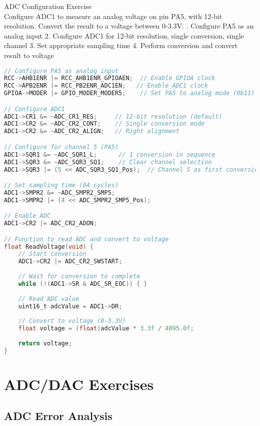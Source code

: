 \begin{example2}{ADC Configuration Exercise}\\
Configure ADC1 to measure an analog voltage on pin PA5, with 12-bit resolution. Convert the result to a voltage between 0-3.3V.
. Configure PA5 as an analog input
2. Configure ADC1 for 12-bit resolution, single conversion, single channel
3. Set appropriate sampling time
4. Perform conversion and convert result to voltage

\begin{lstlisting}[language=C, style=basesmol]
// Configure PA5 as analog input
RCC->AHB1ENR |= RCC_AHB1ENR_GPIOAEN;  // Enable GPIOA clock
RCC->APB2ENR |= RCC_PB2ENR_ADC1EN;   // Enable ADC1 clock
GPIOA->MODER |= GPIO_MODER_MODER5;    // Set PA5 to analog mode (0b11)

// Configure ADC1
ADC1->CR1 &= ~ADC_CR1_RES;     // 12-bit resolution (default)
ADC1->CR2 &= ~ADC_CR2_CONT;    // Single conversion mode
ADC1->CR2 &= ~ADC_CR2_ALIGN;   // Right alignment

// Configure for channel 5 (PA5)
ADC1->SQR1 &= ~ADC_SQR1_L;      // 1 conversion in sequence
ADC1->SQR3 &= ~ADC_SQR3_SQ1;    // Clear channel selection
ADC1->SQR3 |= (5 << ADC_SQR3_SQ1_Pos);  // Channel 5 as first conversion

// Set sampling time (84 cycles)
ADC1->SMPR2 &= ~ADC_SMPR2_SMP5;
ADC1->SMPR2 |= (4 << ADC_SMPR2_SMP5_Pos);

// Enable ADC
ADC1->CR2 |= ADC_CR2_ADON;

// Function to read ADC and convert to voltage
float ReadVoltage(void) {
    // Start conversion
    ADC1->CR2 |= ADC_CR2_SWSTART;
    
    // Wait for conversion to complete
    while (!(ADC1->SR & ADC_SR_EOC)) { }
    
    // Read ADC value
    uint16_t adcValue = ADC1->DR;
    
    // Convert to voltage (0-3.3V)
    float voltage = (float)adcValue * 3.3f / 4095.0f;
    
    return voltage;
}
\end{lstlisting}
\end{example2}

\section{ADC/DAC Exercises}

\subsection{ADC Error Analysis}

